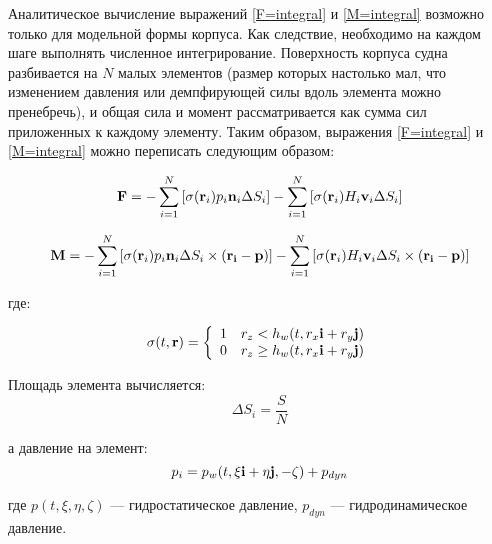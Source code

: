 Аналитическое вычисление выражений \eqref{F=integral} и \eqref{M=integral} возможно только для модельной формы корпуса. Как следствие, необходимо на каждом шаге выполнять численное интегрирование. Поверхность корпуса судна разбивается на $N$ малых элементов (размер которых настолько мал, что изменением давления или демпфирующей силы вдоль элемента можно пренебречь), и общая сила и момент рассматривается как сумма сил приложенных к каждому элементу. Таким образом, выражения \eqref{F=integral} и \eqref{M=integral} можно переписать следующим образом:

\begin{equation}
	\mathbf{F} = 
		-\sum_{i=1}^{N} \left[
			\sigma (\mathbf{r}_i) p_i \mathbf{n}_i \Delta S_i
		\right]
		-\sum_{i=1}^{N} \left[
			\sigma (\mathbf{r}_i) H_i \mathbf{v}_i \Delta S_i
		\right]
\end{equation}

\begin{equation}
	\mathbf{M} = 
		-\sum_{i=1}^{N} \left[
			\sigma (\mathbf{r}_i) p_i \mathbf{n}_i \Delta S_i \times (\mathbf{r_i} - \mathbf{p})
		\right]
		-\sum_{i=1}^{N} \left[
			\sigma (\mathbf{r}_i) H_i \mathbf{v}_i \Delta S_i \times (\mathbf{r_i} - \mathbf{p})
		\right]
\end{equation}

где:

\begin{equation}
  \sigma(t,\mathbf{r}) = \left\{
  \begin{array}{l l}
    1 & r_z		< 		h_w (t, r_x \mathbf{i} + r_y \mathbf{j}) \\
    0 & r_z		\geq 	h_w (t, r_x \mathbf{i} + r_y \mathbf{j}) \\
  \end{array} \right.
\end{equation}

Площадь элемента вычисляется:
\begin{equation}
	\Delta S_i = \frac{S}{N}
\end{equation}

а давление на элемент:
\begin{equation}
	p_i = p_w(t, \xi \mathbf{i} + \eta \mathbf{j}, -\zeta) + p_{dyn}
\end{equation}

где $p(t, \xi, \eta, \zeta)$ --- гидростатическое давление, $p_{dyn}$ --- гидродинамическое давление.


